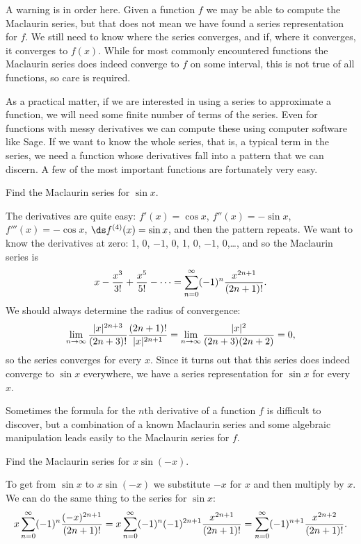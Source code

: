 A warning is in order here. Given a function $f$ we may be able to
compute the Maclaurin series, but that does not mean we have found a
series representation for $f$. We still need to know where the series
converges, and if, where it converges, it converges to $f(x)$. While
for most commonly encountered functions the Maclaurin series does
indeed converge to $f$ on some interval, this is not true of all
functions, so care is required.

As a practical matter, if we are interested in using a series to
approximate a function, we will need some finite number of terms of
the series. Even for functions with messy derivatives we can compute
these using computer software like Sage. If we want to
know the whole series, that is, a typical term in the series, we need
a function whose derivatives fall into a pattern that we can
discern. A few of the most important functions are fortunately very
easy.

\begin{example} Find the Maclaurin series for $\sin x$.

The derivatives are quite easy: $f'(x)=\cos x$, $f''(x)=-\sin x$,
$f'''(x)=-\cos x$, $\ds f^{(4)}(x)=\sin x$, and then the pattern
repeats. We want to know the derivatives at zero:
1, 0, $-1$, 0, 1, 0, $-1$, 0,\dots, and so the Maclaurin series is
$$
  x-{x^3\over 3!}+{x^5\over 5!}-\cdots=
  \sum_{n=0}^\infty (-1)^n{x^{2n+1}\over (2n+1)!}.
$$
We should always determine the radius of convergence:
$$
  \lim_{n\to\infty} {|x|^{2n+3}\over (2n+3)!}{(2n+1)!\over |x|^{2n+1}}
  =\lim_{n\to\infty} {|x|^2\over (2n+3)(2n+2)}=0,
$$
so the series converges for every $x$. Since it turns out that this
series does indeed converge to $\sin x$ everywhere, we have a series
representation for $\sin x$ for every $x$. 
\end{example}

Sometimes the formula for the $n$th derivative of a function $f$ is
difficult to discover, but a combination of a known Maclaurin series
and some algebraic manipulation leads easily to the Maclaurin series
for $f$.

\begin{example} Find the Maclaurin series for $x\sin(-x)$.

To get from $\sin x$ to $x\sin(-x)$ we substitute $-x$ for $x$ and
then multiply by $x$. We can do the same thing to the series for $\sin
x$:
$$
  x\sum_{n=0}^\infty (-1)^n{(-x)^{2n+1}\over (2n+1)!}
  =x\sum_{n=0}^\infty (-1)^{n}(-1)^{2n+1}{x^{2n+1}\over (2n+1)!}
  =\sum_{n=0}^\infty (-1)^{n+1}{x^{2n+2}\over (2n+1)!}.
$$
\end{example}

